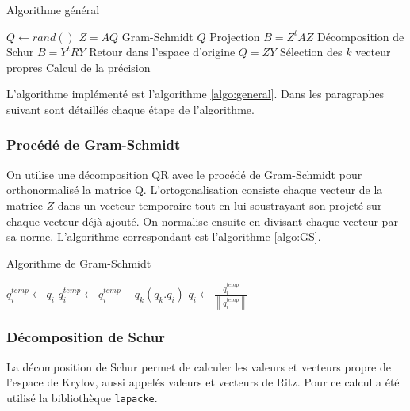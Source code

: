 \documentclass[11pt,a4paper]{article}
\newcommand{\norm}[1]{\left\lVert#1\right\rVert}
\begin{document}
		\begin{algorithm}
			\caption{Algorithme général \label{algo:general}}
			\begin{algorithmic}[1]
					\State $Q \gets rand()$
						\State $Z = AQ$
						\State Gram-Schmidt $Q$
						\State Projection $B = Z^tAZ$
						\State Décomposition de Schur $B = Y^tRY$
						\State Retour dans l'espace d'origine $Q = ZY$
						\State Sélection des $k$ vecteur propres
						\State Calcul de la précision
					\EndWhile
				\end{algorithmic}
		\end{algorithm}

		L'algorithme implémenté est l'algorithme \ref{algo:general}.
		Dans les paragraphes suivant sont détaillés chaque étape de l'algorithme.

		\subsubsection{Procédé de Gram-Schmidt}

			On utilise une décomposition QR avec le procédé de Gram-Schmidt pour orthonormalisé la matrice Q. L'ortogonalisation consiste chaque vecteur de la matrice $Z$ dans un vecteur temporaire tout en lui soustrayant son projeté sur chaque vecteur déjà ajouté. On normalise ensuite en divisant chaque vecteur par sa norme. L'algorithme correspondant est l'algorithme \ref{algo:GS}.

			\begin{algorithm}
				\caption{Algorithme de Gram-Schmidt \label{algo:GS}}
				\begin{algorithmic}[1]
					\For {$i = 0..m-1$}
						\State $q^{temp}_i \gets q_i$
						\For{$k = 0..i$}
						\State $q^{temp}_i \gets q^{temp}_i - q_k(q_k.q_i)$
						\EndFor
					\EndFor
					\For {$i = 0..m-1$}
						\State $q_i \gets \frac{q_i^{temp}}{\norm{q_i^{temp}}}$
					\EndFor
				\end{algorithmic}
			\end{algorithm}

		\subsubsection{Décomposition de Schur}

		La décomposition de Schur permet de calculer les valeurs et vecteurs propre de l'espace de Krylov, aussi appelés valeurs et vecteurs de Ritz. Pour ce calcul a été utilisé la bibliothèque \texttt{lapacke}.
\end{document}
